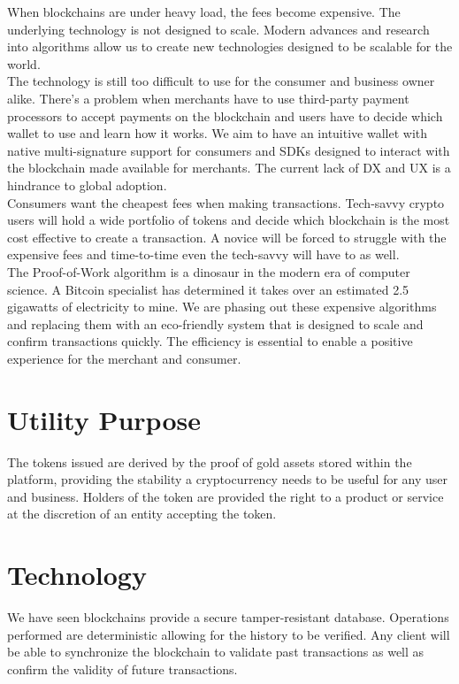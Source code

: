 \documentclass[12pt,a4paper]{article}
\begin{document}
  When blockchains are under heavy load, the fees become expensive. The
  underlying technology is not designed to scale. Modern advances and research
  into algorithms allow us to create new technologies designed to be scalable
  for the world.\\

  The technology is still too difficult to use for the consumer and business
  owner alike. There's a problem when merchants have to use third-party payment
  processors to accept payments on the blockchain and users have to decide which
  wallet to use and learn how it works. We aim to have an intuitive wallet with
  native multi-signature support for consumers and SDKs designed to interact
  with the blockchain made available for merchants. The current lack of DX and
  UX is a hindrance to global adoption.\\

  Consumers want the cheapest fees when making transactions. Tech-savvy crypto
  users will hold a wide portfolio of tokens and decide which blockchain is the
  most cost effective to create a transaction. A novice will be forced to
  struggle with the expensive fees and time-to-time even the tech-savvy will
  have to as well.\\

  \newpage
  The Proof-of-Work algorithm is a dinosaur in the modern era of computer
  science. A Bitcoin specialist has determined it takes over an estimated 2.5
  gigawatts of electricity to mine. We are phasing out these expensive
  algorithms and replacing them with an eco-friendly system that is designed to
  scale and confirm transactions quickly. The efficiency is essential to enable
  a positive experience for the merchant and consumer.\\

  \section{Utility Purpose}
  The tokens issued are derived by the proof of gold assets stored within the
  platform, providing the stability a cryptocurrency needs to be useful for any
  user and business. Holders of the token are provided the right to a product or
  service at the discretion of an entity accepting the token.

  \section{Technology}
  We have seen blockchains provide a secure tamper-resistant database.
  Operations performed are deterministic allowing for the history to be
  verified. Any client will be able to synchronize the blockchain to validate
  past transactions as well as confirm the validity of future transactions.\\
\end{document}

